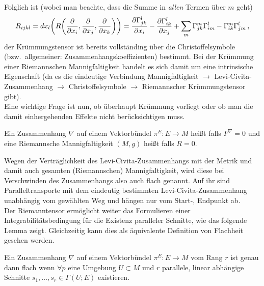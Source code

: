 Folglich ist (wobei man beachte, dass die Summe in \emph{allen} Termen über $m$ geht)
\begin{equation}
R_{ijkl} = dx_l\qty(R\qty(\pdv{x_i}, \pdv{x_j}, \pdv{x_k})) = \pdv{\Gamma_{jk}^l}{x_i} - \pdv{\Gamma_{ik}^l}{x_j} + \sum_m \Gamma_{jk}^m \Gamma_{im}^l - \Gamma_{ik}^m \Gamma_{jm}^l \, ,
\end{equation}
der Krümmungstensor ist bereits vollständing über die Christoffelsymbole (bzw.~allgemeiner: Zusammenhangskoeffizienten) bestimmt. Bei der Krümmung einer Riemannschen Mannigfaltigkeit handelt es sich damit um eine intrinsische Eigenschaft (da es die eindeutige Verbindung Mannigfaltigkeit $\rightarrow$ Levi-Civita-Zusammenhang $\rightarrow$ Christoffelsymbole $\rightarrow$ Riemannscher Krümmungstensor gibt).\\


Eine wichtige Frage ist nun, ob überhaupt Krümmung vorliegt oder ob man die damit einhergehenden Effekte nicht berücksichtigen muss.

\begin{defi}[Flachheit]
Ein Zusammenhang $\nabla$ auf einem Vektorbündel $\pi^E: E \rightarrow M$ heißt  falls $F^\nabla = 0$ und eine Riemannsche Mannigfaltigkeit $(M, g)$ heißt  falls $R = 0$.
\end{defi}

Wegen der Verträglichkeit des Levi-Civita-Zusammenhangs mit der Metrik und damit auch gesamten (Riemannschen) Mannigfaltigkeit, wird diese bei Verschwinden des Zusammenhangs also auch flach genannt. Auf ihr sind Paralleltransporte mit dem eindeutig bestimmten Levi-Civita-Zusammenhang unabhängig vom gewählten Weg und hängen nur vom Start-, Endpunkt ab.\\





Der Riemanntensor ermöglicht weiter das Formulieren einer Integrabilitätsbedingung für die Existenz paralleler Schnitte, wie das folgende Lemma zeigt. Gleichzeitig kann dies als äquivalente Definition von Flachheit gesehen werden.
\begin{satz}[Flachheit V2]
Ein Zusammenhang $\nabla$ auf einem Vektorbündel $\pi^E: E \rightarrow M$ vom Rang $r$ ist genau dann flach wenn $\forall p$ eine Umgebung $U \subset M$ und $r$ parallele, linear abhängige Schnitte $s_1, \dots, s_r \in \Gamma(U; E)$ existieren.
\end{satz}

